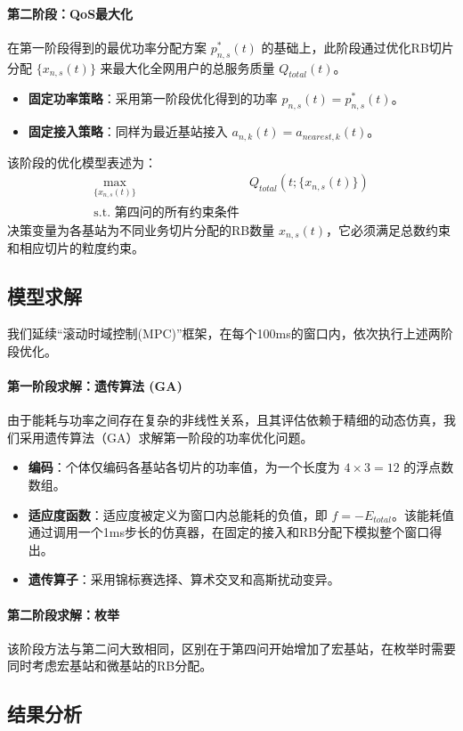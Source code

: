 \paragraph{第二阶段：QoS最大化}
在第一阶段得到的最优功率分配方案 $p^*_{n,s}(t)$ 的基础上，此阶段通过优化RB切片分配 $\{x_{n,s}(t)\}$ 来最大化全网用户的总服务质量 $Q_{total}(t)$。
\begin{itemize}
    \item \textbf{固定功率策略}：采用第一阶段优化得到的功率 $p_{n,s}(t) = p^*_{n,s}(t)$。
    \item \textbf{固定接入策略}：同样为最近基站接入 $a_{n,k}(t) = a_{nearest, k}(t)$。
\end{itemize}
该阶段的优化模型表述为：
\begin{equation}
\begin{aligned}
\max_{\{x_{n,s}(t)\}} \quad & Q_{total}(t; \{x_{n,s}(t)\}) \\
\text{s.t. 第四问的所有约束条件}  
\end{aligned}
\end{equation}
决策变量为各基站为不同业务切片分配的RB数量 $x_{n,s}(t)$，它必须满足总数约束和相应切片的粒度约束。

\subsection{模型求解}

我们延续“滚动时域控制(MPC)”框架，在每个100ms的窗口内，依次执行上述两阶段优化。

\paragraph{第一阶段求解：遗传算法 (GA)}
由于能耗与功率之间存在复杂的非线性关系，且其评估依赖于精细的动态仿真，我们采用遗传算法（GA）求解第一阶段的功率优化问题。
\begin{itemize}
    \item \textbf{编码}：个体仅编码各基站各切片的功率值，为一个长度为 $4 \times 3 = 12$ 的浮点数数组。
    \item \textbf{适应度函数}：适应度被定义为窗口内总能耗的负值，即 $f = -E_{total}$。该能耗值通过调用一个1ms步长的仿真器，在固定的接入和RB分配下模拟整个窗口得出。
    \item \textbf{遗传算子}：采用锦标赛选择、算术交叉和高斯扰动变异。
\end{itemize}

\paragraph{第二阶段求解：枚举}
该阶段方法与第二问大致相同，区别在于第四问开始增加了宏基站，在枚举时需要同时考虑宏基站和微基站的RB分配。

\subsection{结果分析}

